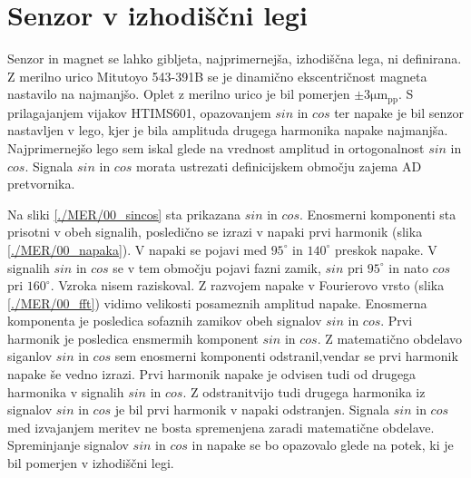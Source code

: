\section{Senzor v izhodiščni legi}
Senzor in magnet se lahko gibljeta, najprimernejša, izhodiščna lega, ni definirana. Z merilno urico Mitutoyo 543-391B se je dinamično ekscentričnost magneta nastavilo na najmanjšo. Oplet z merilno urico je bil pomerjen $\pm 3 \mathrm{\mu m_{pp}}$.
S prilagajanjem vijakov HTIMS601, opazovanjem $sin$ in $cos$ ter napake je bil senzor nastavljen v lego, kjer je bila amplituda drugega harmonika napake najmanjša. Najprimernejšo lego sem iskal glede na vrednost amplitud in ortogonalnost  $sin$ in $cos$. Signala $sin$ in $cos$ morata ustrezati definicijskem območju zajema AD pretvornika.

Na sliki \ref{./MER/00_sincos} sta prikazana $sin$ in $cos$. Enosmerni komponenti sta prisotni v obeh signalih, posledično se izrazi v napaki prvi harmonik (slika \ref{./MER/00_napaka}).
V napaki se pojavi med $\mathrm{95^\circ}$ in $\mathrm{140^\circ}$ preskok napake. V signalih $sin$ in $cos$ se v tem območju pojavi fazni zamik, $sin$ pri $\mathrm{95^\circ}$ in nato $cos$ pri $\mathrm{160^\circ}$. Vzroka nisem raziskoval.
Z razvojem napake v Fourierovo vrsto (slika \ref{./MER/00_fft}) vidimo velikosti posameznih amplitud napake.
Enosmerna komponenta je posledica sofaznih zamikov obeh signalov $sin$ in $cos$. 
Prvi harmonik je posledica ensmermih komponent $sin$ in $cos$. Z matematično obdelavo siganlov $sin$ in $cos$ sem enosmerni komponenti odstranil,vendar se prvi harmonik napake še vedno izrazi. Prvi harmonik napake je odvisen tudi od drugega harmonika v signalih $sin$ in $cos$.
Z odstranitvijo tudi drugega harmonika iz signalov $sin$ in $cos$ je bil  prvi harmonik v napaki odstranjen.
Signala  $sin$ in $cos$ med izvajanjem meritev ne bosta spremenjena zaradi matematične obdelave. Spreminjanje signalov  $sin$ in $cos$ in napake se bo opazovalo glede na potek, ki je bil pomerjen v izhodiščni legi.
\newpage
